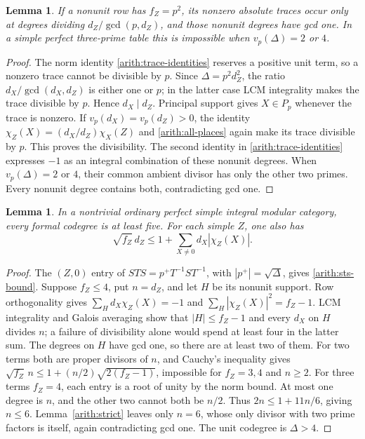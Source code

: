 \documentclass[11pt,a4paper]{article}
\numberwithin{equation}{section}
\newtheorem{lemma}[theorem]{Lemma}
\begin{document}
\begin{lemma}\label{arith:prime-square-quartic}
If a nonunit row has $f_Z=p^2$, its nonzero absolute traces occur
only at degrees dividing $d_Z/\gcd(p,d_Z)$, and those nonunit
degrees have gcd one. In a simple perfect three-prime table this
is impossible when $v_p(\Delta)=2$ or $4$.
\end{lemma}
\begin{proof}
The norm identity \eqref{arith:trace-identities} reserves a positive
unit term, so a nonzero trace cannot be divisible by $p$.
Since $\Delta=p^2d_Z^2$, the ratio
$d_X/\gcd(d_X,d_Z)$ is either one or $p$; in the latter case
LCM integrality makes the trace divisible by $p$. Hence $d_X\mid d_Z$.
Principal support gives $X\in P_p$ whenever the trace is nonzero.
If $v_p(d_X)=v_p(d_Z)>0$, the identity
$\chi_Z(X)=(d_X/d_Z)\chi_X(Z)$ and \eqref{arith:all-places}
again make its trace divisible by $p$. This proves the divisibility.
The second identity in \eqref{arith:trace-identities} expresses
$-1$ as an integral combination of these nonunit degrees.
When $v_p(\Delta)=2$ or $4$, their common ambient divisor has
only the other two primes. Every nonunit degree contains both,
contradicting gcd one.
\end{proof}

\begin{lemma}\label{arith:small-codegrees}
In a nontrivial ordinary perfect simple integral modular category, every
formal codegree is at least five. For each simple $Z$, one also has
\begin{equation}\label{arith:sts-bound}
 \sqrt{f_Z}\,d_Z\le
                1+\sum_{X\ne0}d_X|\chi_Z(X)|.
\end{equation}
\end{lemma}
\begin{proof}
The $(Z,0)$ entry of $STS=p^+T^{-1}ST^{-1}$, with
$|p^+|=\sqrt\Delta$, gives \eqref{arith:sts-bound}.
Suppose $f_Z\le4$, put $n=d_Z$, and let $H$ be its nonunit
support. Row orthogonality gives
$\sum_{H}d_X\chi_Z(X)=-1$ and
$\sum_H|\chi_Z(X)|^2=f_Z-1$.
LCM integrality and Galois averaging show that $|H|\le f_Z-1$
and every $d_X$ on $H$ divides $n$; a failure of divisibility
alone would spend at least four in the latter sum. The degrees
on $H$ have gcd one, so there are at least two of them.
For two terms both are proper divisors of $n$, and Cauchy's
inequality gives
$\sqrt{f_Z}\,n\le1+(n/2)\sqrt{2(f_Z-1)}$, impossible for
$f_Z=3,4$ and $n\ge2$.
For three terms $f_Z=4$, each entry is a root of unity by the
norm bound. At most one degree is $n$, and the other two cannot
both be $n/2$. Thus $2n\le1+11n/6$, giving $n\le6$.
Lemma~\ref{arith:strict} leaves only $n=6$, whose only divisor
with two prime factors is itself, again contradicting gcd one.
The unit codegree is $\Delta>4$.
\end{proof}
\end{document}
